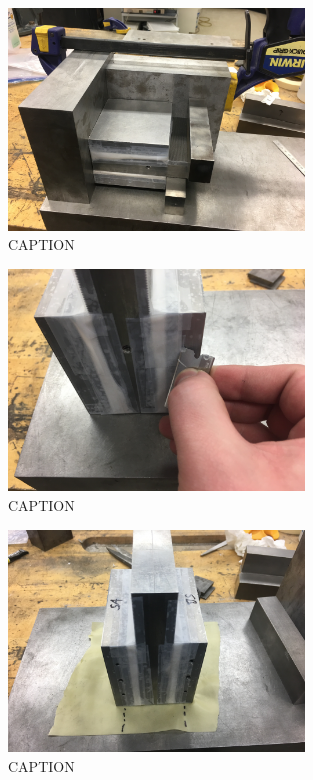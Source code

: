 \begin{figure}
	\centering
        \includegraphics[width=0.7\textwidth]{appendix_sample_prep/dds_two_block_jig.jpg}
   	\caption{CAPTION}
  	\label{Fig:dds_two_block_jig}
\end{figure}

\clearpage

\begin{figure}
	\centering
        \includegraphics[width=0.7\textwidth]{appendix_sample_prep/dds_trim_holes.jpg}
   	\caption{CAPTION}
  	\label{Fig:dds_trim_holes}
\end{figure}

\begin{figure}
	\centering
        \includegraphics[width=0.7\textwidth]{appendix_sample_prep/dds_mark_rubber.jpg}
   	\caption{CAPTION}
  	\label{Fig:dds_mark_rubber}
\end{figure}

